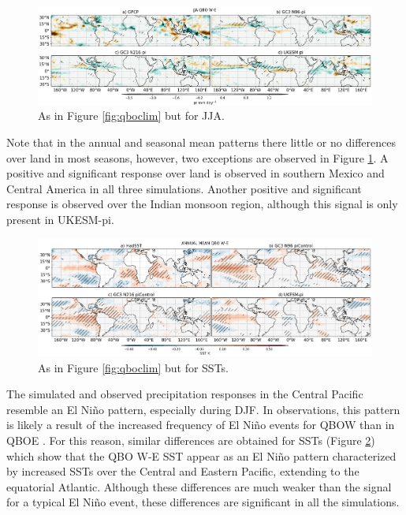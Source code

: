 \begin{figure}[t!]
\centering
 \includegraphics[width=\linewidth]{figures/piprjjaqbowqboe.png}
\caption[JJA mean precipitation composite difference QBO W-E ]{ As in Figure \ref{fig:qboclim} but for JJA. }
\label{fig:qbojja}
\end{figure}


 Note that in the annual and seasonal mean patterns there little or no differences over land in most seasons, however, two exceptions are observed in Figure \ref{fig:qbojja}. 
A positive and significant response over land is observed in southern Mexico and Central America in all three simulations. Another positive and significant response is observed over the Indian monsoon region, although this signal is only present in UKESM-pi. 

\begin{figure}[t!]
\centering
 \includegraphics[width=\linewidth]{figures/pisstclimqbowqboe.png}
\caption[Annual mean SST difference QBO W-E under different QBO phases.]{ As in Figure \ref{fig:qboclim} but for SSTs.}
\label{fig:sstclim}
\end{figure}

The simulated and observed precipitation responses in the Central Pacific resemble an El Niño pattern, especially during DJF. In observations, this pattern is likely a result of the increased frequency of El Niño events for QBOW than in QBOE \citep{liess2012}. 
For this reason, similar differences are obtained for SSTs (Figure \ref{fig:sstclim}) which show that the QBO W-E SST appear as an El Niño pattern characterized by increased SSTs over the Central and Eastern Pacific, extending to the equatorial Atlantic. 
Although these differences are much weaker than the signal for a typical El Niño event, these differences are significant in all the simulations.%

